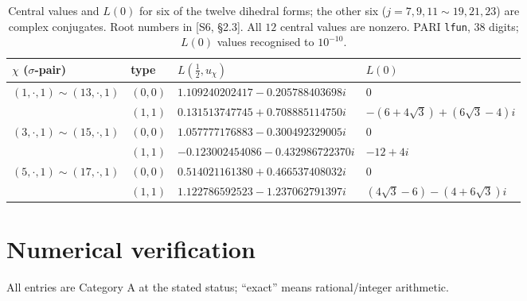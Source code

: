 \documentclass[11pt]{article}
\theoremstyle{definition}
\newcommand{\src}[1]{\textup{[S#1]}}
\begin{document}
\begin{table}[ht]\centering\small
\begin{tabular}{llll}\toprule
$\chi$ ($\sigma$-pair) & type & $L(\tfrac12,u_\chi)$ & $L(0)$\\\midrule
$(1,\cdot,1)\sim(13,\cdot,1)$ & $(0,0)$ & $1.109240202417-0.205788403698i$ & $0$\\
 & $(1,1)$ & $0.131513747745+0.708885114750i$ & $-(6+4\sqrt3)+(6\sqrt3-4)i$\\
$(3,\cdot,1)\sim(15,\cdot,1)$ & $(0,0)$ & $1.057777176883-0.300492329005i$ & $0$\\
 & $(1,1)$ & $-0.123002454086-0.432986722370i$ & $-12+4i$\\
$(5,\cdot,1)\sim(17,\cdot,1)$ & $(0,0)$ & $0.514021161380+0.466537408032i$ & $0$\\
 & $(1,1)$ & $1.122786592523-1.237062791397i$ & $(4\sqrt3-6)-(4+6\sqrt3)i$\\\bottomrule
\end{tabular}
\caption{Central values and $L(0)$ for six of the twelve dihedral forms; the other six ($j=7,9,11\sim19,21,23$) are complex conjugates. Root numbers in
\src{6, \S2.3}. All $12$ central values are nonzero. PARI \texttt{lfun}, 38 digits; $L(0)$ values recognised to $10^{-10}$.}\label{tab:L}
\end{table}

\section{Numerical verification}\label{sec:num}
All entries are Category A at the stated status; ``exact'' means rational/integer arithmetic.
\end{document}
